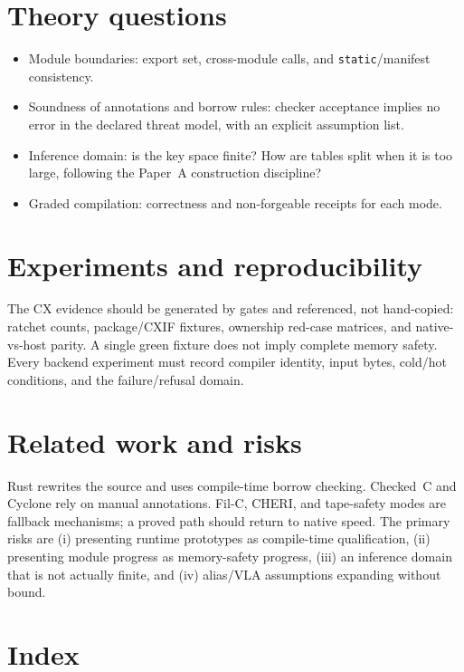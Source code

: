 \documentclass[11pt]{article}
\begin{document}
\section{Theory questions}

\begin{itemize}
\item Module boundaries: export set, cross-module calls, and
  \texttt{static}/manifest consistency.
\item Soundness of annotations and borrow rules: checker acceptance implies no
  error in the declared threat model, with an explicit assumption list.
\item Inference domain: is the key space finite? How are tables split when it is
  too large, following the Paper~A construction discipline?
\item Graded compilation: correctness and non-forgeable receipts for each mode.
\end{itemize}

\section{Experiments and reproducibility}

The CX evidence should be generated by gates and referenced, not hand-copied:
ratchet counts, package/CXIF fixtures, ownership red-case matrices, and
native-vs-host parity. A single green fixture does not imply complete memory
safety. Every backend experiment must record compiler identity, input bytes, cold/hot
conditions, and the failure/refusal domain.

\section{Related work and risks}

Rust rewrites the source and uses compile-time borrow checking. Checked~C and
Cyclone rely on manual annotations. Fil-C, CHERI, and tape-safety modes are
fallback mechanisms; a proved path should return to native speed. The primary
risks are (i) presenting runtime prototypes as compile-time qualification,
(ii) presenting module progress as memory-safety progress, (iii) an inference
domain that is not actually finite, and (iv) alias/VLA assumptions expanding
without bound.

\section{Index}
\end{document}
